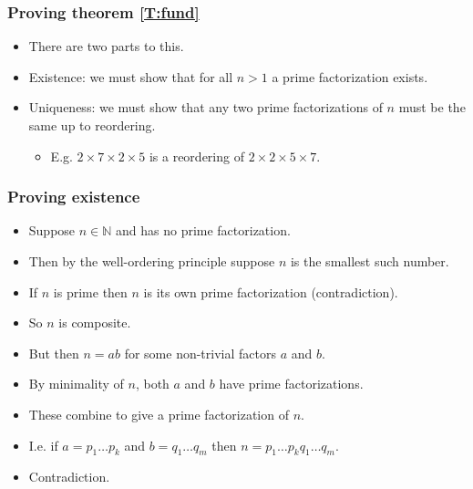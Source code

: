 \documentclass[handout]{beamer}
\newcommand{\bN}{\mathbb{N}}
\begin{document}
\begin{frame}
\frametitle{Proving theorem \ref{T:fund}}
\begin{itemize}
\item There are two parts to this.
\vspace{0.5cm}
\item Existence: we must show that for all $n > 1$ a prime factorization exists.
\vspace{0.5cm}
\item Uniqueness: we must show that any two prime factorizations of $n$ must be the same up to reordering.
\begin{itemize}
\item E.g. $2\times 7\times 2\times 5$ is a reordering of $2\times 2\times 5\times 7$.
\end{itemize}
\end{itemize}
\end{frame}

\begin{frame}
\frametitle{Proving existence}
\begin{itemize}
\item Suppose $n\in \bN$ and has no prime factorization.
\vspace{0.2cm}
\item Then by the well-ordering principle suppose $n$ is the smallest such number. 
\vspace{0.2cm}
\item If $n$ is prime then $n$ is its own prime factorization (contradiction). 
\vspace{0.2cm}
\item So $n$ is composite. 
\vspace{0.2cm}
\item But then $n=ab$ for some non-trivial factors $a$ and $b$. 
\vspace{0.2cm}
\item By minimality of $n$, both $a$ and $b$ have prime factorizations. 
\vspace{0.2cm}
\item These combine to give a prime factorization of $n$. 
\vspace{0.2cm}
\item I.e. if $a=p_1\ldots p_k$ and $b= q_1\ldots q_m$ then $n=p_1\ldots p_kq_1\ldots q_m$. 
\vspace{0.2cm}
\item Contradiction.
\end{itemize}
\end{frame}
\end{document}
